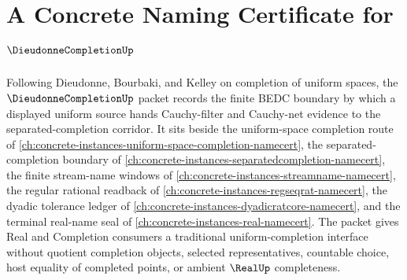 \chapter{A Concrete Naming Certificate for $\DieudonneCompletionUp$}
\label{ch:concrete-instances-dieudonne-completion-namecert}

Following Dieudonne, Bourbaki, and Kelley on completion of uniform spaces, the $\DieudonneCompletionUp$ packet records the finite BEDC boundary by which a displayed uniform source hands Cauchy-filter and Cauchy-net evidence to the separated-completion corridor. It sits beside the uniform-space completion route of \autoref{ch:concrete-instances-uniform-space-completion-namecert}, the separated-completion boundary of \autoref{ch:concrete-instances-separatedcompletion-namecert}, the finite stream-name windows of \autoref{ch:concrete-instances-streamname-namecert}, the regular rational readback of \autoref{ch:concrete-instances-regseqrat-namecert}, the dyadic tolerance ledger of \autoref{ch:concrete-instances-dyadicratcore-namecert}, and the terminal real-name seal of \autoref{ch:concrete-instances-real-namecert}. The packet gives Real and Completion consumers a traditional uniform-completion interface without quotient completion objects, selected representatives, countable choice, host equality of completed points, or ambient $\RealUp$ completeness.

